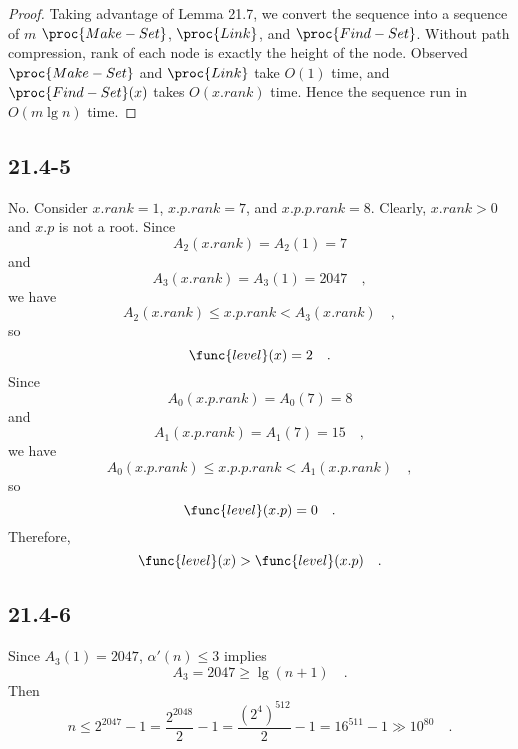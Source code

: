 \begin{proof}
    Taking advantage of Lemma 21.7, we convert the sequence into 
    a sequence of $m$ $\proc{Make-Set}$, $\proc{Link}$, and $\proc{Find-Set}$.
    Without path compression, 
    rank of each node is exactly the height of the node.
    Observed $\proc{Make-Set}$ and $\proc{Link}$ take $O(1)$ time,
    and $\proc{Find-Set}(x)$ takes $O(x.rank)$ time.
    Hence the sequence run in $O(m \lg n)$ time.
\end{proof}

\subsection*{21.4-5}

No.
Consider $x.rank = 1$, $x.p.rank = 7$, and $x.p.p.rank = 8$.
Clearly, $x.rank > 0$ and $x.p$ is not a root.
Since 
\begin{equation*}
    A_2(x.rank) = A_2(1) = 7
\end{equation*}
and
\begin{equation*}
    A_3(x.rank) = A_3(1) = 2047 \quad,
\end{equation*}
we have
\begin{equation*}
    A_2(x.rank) \leq x.p.rank < A_3(x.rank) \quad,
\end{equation*}
so
\begin{equation*}
    \func{level}(x) = 2 \quad.
\end{equation*}
Since
\begin{equation*}
    A_0(x.p.rank) = A_0(7) = 8
\end{equation*}
and
\begin{equation*}
    A_1(x.p.rank) = A_1(7) = 15 \quad,
\end{equation*}
we have
\begin{equation*}
    A_0(x.p.rank) \leq x.p.p.rank < A_1(x.p.rank) \quad,
\end{equation*}
so
\begin{equation*}
    \func{level}(x.p) = 0 \quad.
\end{equation*}
Therefore,
\begin{equation*}
    \func{level}(x) > \func{level}(x.p) \quad.
\end{equation*}

\subsection*{21.4-6}

Since $A_3(1) = 2047$, $\alpha'(n) \leq 3$ implies
\begin{equation*}
    A_3 = 2047 \geq \lg (n + 1) \quad.
\end{equation*}
Then 
\begin{equation*}
    n \leq 2^{2047} - 1 = \frac{2^{2048}}{2} - 1 
    = \frac{(2^4)^{512}}{2} - 1 = 16^{511} - 1 \gg 10^{80} \quad.
\end{equation*}

